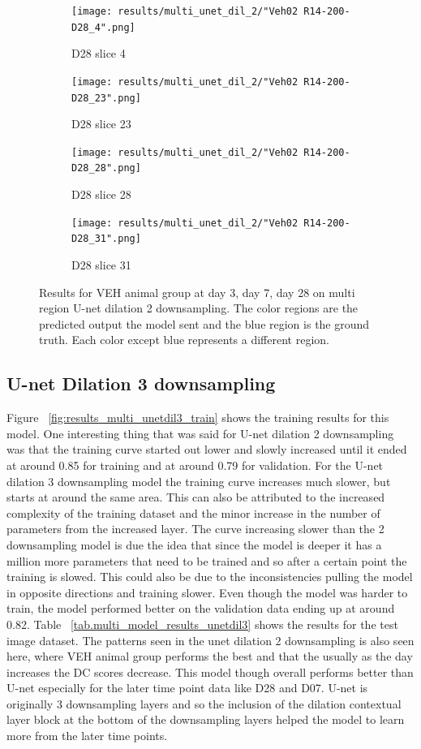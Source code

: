 \begin{figure}[!htb]
\medskip
\begin{subfigure}{0.25\textwidth}
  \texttt{[image: results/multi\_unet\_dil\_2/"Veh02 R14-200-D28\_4".png]}
  \caption{D28 slice 4}
\end{subfigure}\hfil %
\begin{subfigure}{0.25\textwidth}
  \texttt{[image: results/multi\_unet\_dil\_2/"Veh02 R14-200-D28\_23".png]}
  \caption{D28 slice 23}
\end{subfigure}\hfil %
\begin{subfigure}{0.25\textwidth}
  \texttt{[image: results/multi\_unet\_dil\_2/"Veh02 R14-200-D28\_28".png]}
  \caption{D28 slice 28}
\end{subfigure}\hfil %
\begin{subfigure}{0.25\textwidth}
  \texttt{[image: results/multi\_unet\_dil\_2/"Veh02 R14-200-D28\_31".png]}
  \caption{D28 slice 31}
\end{subfigure}
  
  \caption{Results for VEH animal group at day 3, day 7, day 28 on multi region U-net dilation 2 downsampling. The color regions are the predicted output the model sent and the blue region is the ground truth. Each color except blue represents a different region.}
  \label{fig:results_multi_unetdil2_VEH}
\end{figure}



\subsection{U-net Dilation 3 downsampling}
Figure ~\ref{fig:results_multi_unetdil3_train} shows the training results for this model.
One interesting thing that was said for U-net dilation 2 downsampling was that the training curve started out lower and slowly increased until it ended at around 0.85 for training and at around 0.79 for validation. 
For the U-net dilation 3 downsampling model the training curve increases much slower, but starts at around the same area.
This can also be attributed to the increased complexity of the training dataset and the minor increase in the number of parameters from the increased layer. 
The curve increasing slower than the 2 downsampling model is due the idea that since the model is deeper it has a million more parameters that need to be trained and so after a certain point the training is slowed.
This could also be due to the inconsistencies pulling the model in opposite directions and training slower. 
Even though the model was harder to train, the model performed better on the validation data ending up at around 0.82. 
Table ~\ref{tab.multi_model_results_unetdil3} shows the results for the test image dataset. 
The patterns seen in the unet dilation 2 downsampling is also seen here, where VEH animal group performs the best and that the usually as the day increases the DC scores decrease. 
This model though overall performs better than U-net especially for the later time point data like D28 and D07.
U-net is originally 3 downsampling layers and so the inclusion of the dilation contextual layer block at the bottom of the downsampling layers helped the model to learn more from the later time points. 


